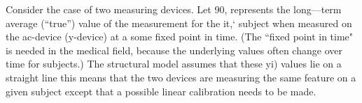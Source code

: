 \documentclass[]{article}
\begin{document}
Consider the case of two measuring devices. Let 90,  represents the long—term
average (“true”) value of the measurement for the it,‘ subject when measured on
the ac-device (y-device) at a some ﬁxed point in time. (The “ﬁxed point in time" is
needed in the medical ﬁeld, because the underlying values often change over time for
subjects.) The structural model assumes that these  yi) values lie on a straight
line this means that the two devices are measuring the same feature on a given
subject except that a possible linear calibration needs to be made. 
\end{document}
